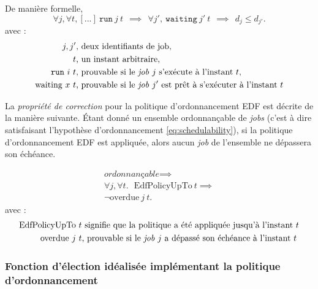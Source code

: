 	De manière formelle,
	\begin{equation*}
		\forall j, \forall t, [...]~\mathtt{run}~j~t~~\implies~~\forall j',~\mathtt{waiting}~j'~t~~\implies~~d_j \leq d_{j'}.
	\end{equation*}
\indent avec :
	\begin{align*}
		j, j'&\text{, deux identifiants de job},\\
		t&\text{, un instant arbitraire},\\
		\mathtt{run}~i~t&\text{, prouvable si le \emph{job} $j$ s'exécute à l'instant $t$},\\ 
		\text{waiting}~x~t&\text{, prouvable si le \emph{job} $j'$ est prêt à s'exécuter à l'instant $t$}
	\end{align*}

	La \emph{propriété de correction} pour la politique d'ordonnancement EDF est décrite de la manière suivante.
	Étant donné un ensemble ordonnançable de \emph{jobs} (c'est à dire satisfaisant l'hypothèse d'ordonnancement \ref{eq:schedulability}), si la politique d'ordonnancement EDF est appliquée, alors aucun \emph{job} de l'ensemble ne dépassera son échéance.
	
	\begin{gather*}
		\textit{ordonnançable} \implies\\
  		\forall j, \forall t.~~~\text{EdfPolicyUpTo}~t \implies\\
		\neg \text{overdue}~j~t.
	\end{gather*}
\indent	avec :
	\begin{align*}
		\text{EdfPolicyUpTo}~t&\text{ signifie que la politique a été appliquée jusqu'à l'instant}~t\\
		\text{overdue}~j~t&\text{, prouvable si le \emph{job} $j$ a dépassé son échéance à l'instant}~t
	\end{align*}

	\subsubsection{Fonction d'élection idéalisée implémentant la politique d'ordonnancement}
	\label{sec:functional}

